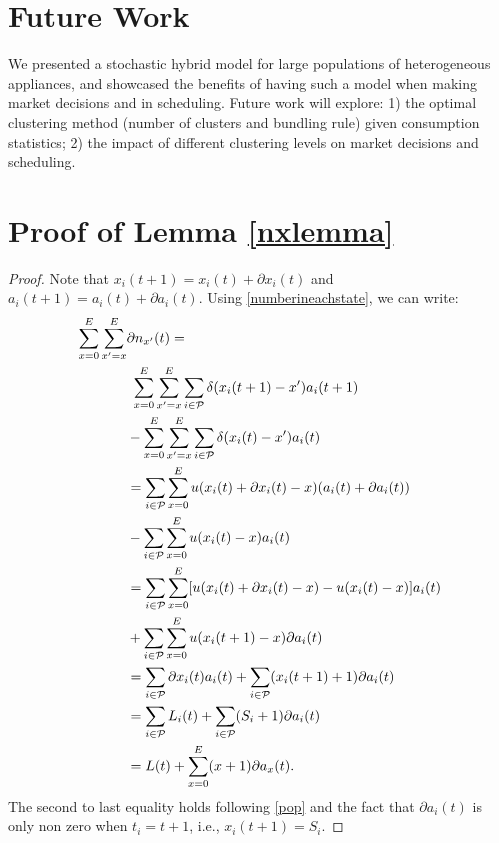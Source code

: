 \documentclass[10pt]{IEEEtran}
\begin{document}
\section{Future Work}\label{sec.conclusion}
We presented a stochastic hybrid model for large populations of heterogeneous appliances, and showcased the benefits of having such a model when making market decisions and in scheduling. Future work will explore: 1) the optimal clustering method (number of clusters and bundling rule) given consumption statistics; 2) the impact of different clustering levels on market decisions and scheduling. 


\appendices
\section{Proof of Lemma \ref{nxlemma}}\label{prooflemma}
 \begin{proof} Note that $x_i(t+1)=x_i(t)+\partial x_i(t)$ and $a_i(t+1)=a_i(t)+\partial a_i(t)$. Using \eqref{numberineachstate}, we can write:
\begin{align*}
\sum_{x=0}^{E}\sum_{x'=x}^{E} &\partial n_{x'}(t) = \\&~\sum_{x=0}^{E} \sum_{x'=x}^{E}\sum_{i\in {\cal P}} \delta(x_i(t+1)-x')a_i(t+1)\\
		      &-\sum_{x=0}^{E} \sum_{x'=x}^{E} \sum_{i\in {\cal P}}\delta(x_i(t)-x')a_i(t)\\
		      &=\sum_{i\in {\cal P}}\sum_{x=0}^{E}u(x_i(t)+\partial x_i(t)-x)(a_i(t)+\partial a_i(t))\\
		      &-\sum_{i\in {\cal P}}\sum_{x=0}^{E}u(x_i(t)-x)a_i(t)\\
		      &=\sum_{i\in {\cal P}}\sum_{x=0}^{E} [u(x_i(t)+\partial x_i(t)-x)-u(x_i(t)-x)]a_i(t)\\
		      &+\sum_{i\in {\cal P}}\sum_{x=0}^{E}u(x_i(t+1)  -x)\partial a_i(t)\\
		      &= \sum_{i\in {\cal P}}\partial x_i(t) a_i(t)+ \sum_{i\in {\cal P}} (x_i(t+1)+1) \partial a_i(t) \\
		      &=\sum_{i\in {\cal P}}L_i(t)+ \sum_{i\in {\cal P}} (S_i+1) \partial a_i(t)  \\
&=L(t)+ \sum_{x=0}^{E} (x+1) \partial a_x(t).
\end{align*}
The second to last equality holds following \eqref{pop} and the fact that $\partial a_i(t)$ is only non zero when $t_i = t+1$, i.e., $x_i(t+1) = S_i$.
\end{proof}


\small

\end{document}
